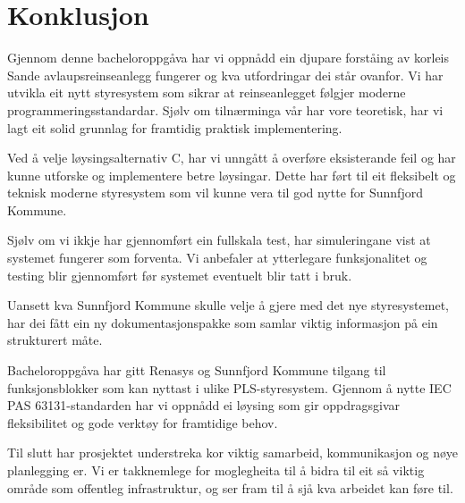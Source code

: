 \chapter{Konklusjon}
\thispagestyle{fancy}

Gjennom denne bacheloroppgåva har vi oppnådd ein djupare forståing av korleis Sande avlaupsreinseanlegg fungerer og kva utfordringar dei står ovanfor. 
Vi har utvikla eit nytt styresystem som sikrar at reinseanlegget følgjer moderne programmeringsstandardar. 
Sjølv om tilnærminga vår har vore teoretisk, har vi lagt eit solid grunnlag for framtidig praktisk implementering.

Ved å velje løysingsalternativ C, har vi unngått å overføre eksisterande feil og har kunne utforske og implementere betre løysingar. 
Dette har ført til eit fleksibelt og teknisk moderne styresystem som vil kunne vera til god nytte for \gls{Sunnfjord Kommune}.

Sjølv om vi ikkje har gjennomført ein fullskala test, har simuleringane vist at systemet fungerer som forventa. 
Vi anbefaler at ytterlegare funksjonalitet og testing blir gjennomført før systemet eventuelt blir tatt i bruk.

Uansett kva \gls{Sunnfjord Kommune} skulle velje å gjere med det nye styresystemet, har dei fått ein ny dokumentasjonspakke 
som samlar viktig informasjon på ein strukturert måte.

Bacheloroppgåva har gitt \gls{Renasys} og \gls{Sunnfjord Kommune} tilgang til funksjonsblokker som kan nyttast i ulike PLS-styresystem. 
Gjennom å nytte \gls{IEC} \gls{PAS} 63131-standarden har vi oppnådd ei løysing som gir oppdragsgivar fleksibilitet og gode verktøy for framtidige behov.

Til slutt har prosjektet understreka kor viktig samarbeid, kommunikasjon og nøye planlegging er.
Vi er takknemlege for moglegheita til å bidra til eit så viktig område som offentleg infrastruktur, og ser fram til å sjå kva arbeidet kan føre til.

